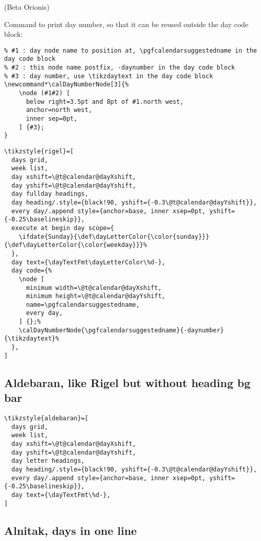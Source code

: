 \documentclass[11pt,oneside]{memoir-article}
\begin{document}
(Beta Orionis)

Command to print day number, so that it can be reused outside the day code block:

\begin{verbatim}
% #1 : day node name to position at, \pgfcalendarsuggestedname in the day code block
% #2 : this node name postfix, -daynumber in the day code block
% #3 : day number, use \tikzdaytext in the day code block
\newcommand*\calDayNumberNode[3]{%
    \node (#1#2) [
      below right=3.5pt and 8pt of #1.north west,
      anchor=north west,
      inner sep=0pt,
    ] {#3};
}
\end{verbatim}

\begin{verbatim}
\tikzstyle{rigel}=[
  days grid,
  week list,
  day xshift=\@t@calendar@dayXshift,
  day yshift=\@t@calendar@dayYshift,
  day fullday headings,
  day heading/.style={black!90, yshift={-0.3\@t@calendar@dayYshift}},
  every day/.append style={anchor=base, inner xsep=0pt, yshift={-0.25\baselineskip}},
  execute at begin day scope={
    \ifdate{Sunday}{\def\dayLetterColor{\color{sunday}}}{\def\dayLetterColor{\color{weekday}}}%
  },
  day text={\dayTextFmt\dayLetterColor\%d-},
  day code={%
    \node [
      minimum width=\@t@calendar@dayXshift,
      minimum height=\@t@calendar@dayYshift,
      name=\pgfcalendarsuggestedname,
      every day,
    ] {};%
    \calDayNumberNode{\pgfcalendarsuggestedname}{-daynumber}{\tikzdaytext}%
  },
]
\end{verbatim}

\subsection{Aldebaran, like Rigel but without heading bg bar}
\label{sec:org461aa09}

\begin{verbatim}
\tikzstyle{aldebaran}=[
  days grid,
  week list,
  day xshift=\@t@calendar@dayXshift,
  day yshift=\@t@calendar@dayYshift,
  day letter headings,
  day heading/.style={black!90, yshift={-0.3\@t@calendar@dayYshift}},
  every day/.append style={anchor=base, inner xsep=0pt, yshift={-0.25\baselineskip}},
  day text={\dayTextFmt\%d-},
]
\end{verbatim}

\subsection{Alnitak, days in one line}
\label{sec:orgefe3e66}
\end{document}
